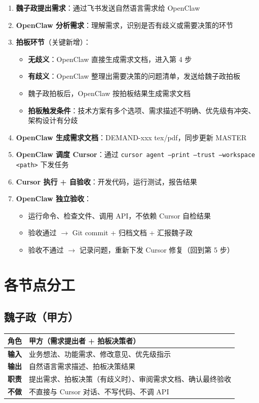\documentclass[11pt,a4paper]{article}
\begin{document}
\begin{enumerate}
  \item \textbf{魏子政提出需求}：通过飞书发送自然语言需求给 OpenClaw
  \item \textbf{OpenClaw 分析需求}：理解需求，识别是否有歧义或需要决策的环节
  \item \textbf{拍板环节}（关键新增）：
    \begin{itemize}[nosep]
      \item \textbf{无歧义}：OpenClaw 直接生成需求文档，进入第 4 步
      \item \textbf{有歧义}：OpenClaw 整理出需要决策的问题清单，发送给魏子政拍板
      \item 魏子政拍板后，OpenClaw 按拍板结果生成需求文档
      \item \textbf{拍板触发条件}：技术方案有多个选项、需求描述不明确、优先级有冲突、架构设计有分歧
    \end{itemize}
  \item \textbf{OpenClaw 生成需求文档}：DEMAND-xxx tex/pdf，同步更新 MASTER
  \item \textbf{OpenClaw 调度 Cursor}：通过 \texttt{cursor agent --print --trust --workspace <path>} 下发任务
  \item \textbf{Cursor 执行 + 自验收}：开发代码，运行测试，报告结果
  \item \textbf{OpenClaw 独立验收}：
    \begin{itemize}[nosep]
      \item 运行命令、检查文件、调用 API，不依赖 Cursor 自检结果
      \item 验收通过 $\to$ Git commit + 归档文档 + 汇报魏子政
      \item 验收不通过 $\to$ 记录问题，重新下发 Cursor 修复（回到第 5 步）
    \end{itemize}
\end{enumerate}

\section{各节点分工}

\subsection{魏子政（甲方）}

\begin{table}[h]
\centering
\begin{tabularx}{\linewidth}{>{\bfseries}p{2.5cm} X}
\toprule
角色 & 甲方（需求提出者 + 拍板决策者） \\
\midrule
输入 & 业务想法、功能需求、修改意见、优先级指示 \\
输出 & 自然语言需求描述、拍板决策结果 \\
职责 & 提出需求、拍板决策（有歧义时）、审阅需求文档、确认最终验收 \\
不做 & 不直接与 Cursor 对话、不写代码、不调 API \\
\bottomrule
\end{tabularx}
\end{table}
\end{document}
